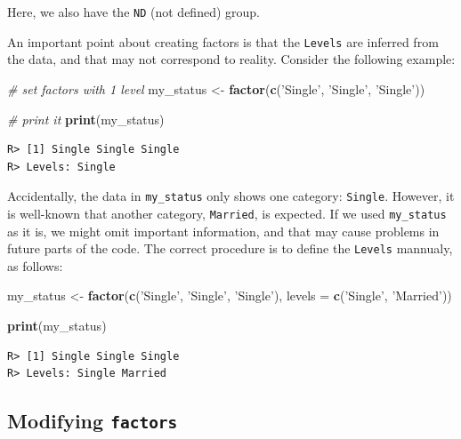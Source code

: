 \documentclass[
  12pt,
]{book}
\newenvironment{Shaded}{\begin{snugshade}}{\end{snugshade}}
\newcommand{\CommentTok}[1]{\textcolor[rgb]{0.37,0.37,0.37}{\textit{#1}}}
\newcommand{\DataTypeTok}[1]{\textcolor[rgb]{0.27,0.27,0.27}{#1}}
\newcommand{\KeywordTok}[1]{\textcolor[rgb]{0.27,0.27,0.27}{\textbf{#1}}}
\newcommand{\NormalTok}[1]{#1}
\newcommand{\StringTok}[1]{\textcolor[rgb]{0.5,0.5,0.5}{#1}}
\begin{document}
Here, we also have the \texttt{ND} (not defined) group.

An important point about creating factors is that the \texttt{Levels} are inferred from the data, and that may not correspond to reality. Consider the following example:

\begin{Shaded}
\begin{Highlighting}[]
\CommentTok{# set factors with 1 level}
\NormalTok{my_status <-}\StringTok{ }\KeywordTok{factor}\NormalTok{(}\KeywordTok{c}\NormalTok{(}\StringTok{'Single'}\NormalTok{, }\StringTok{'Single'}\NormalTok{, }\StringTok{'Single'}\NormalTok{))}

\CommentTok{# print it}
\KeywordTok{print}\NormalTok{(my_status)}
\end{Highlighting}
\end{Shaded}

\begin{verbatim}
R> [1] Single Single Single
R> Levels: Single
\end{verbatim}

Accidentally, the data in \texttt{my\_status} only shows one category: \texttt{Single}. However, it is well-known that another category, \texttt{Married}, is expected. If we used \texttt{my\_status} as it is, we might omit important information, and that may cause problems in future parts of the code. The correct procedure is to define the \texttt{Levels} mannualy, as follows:

\begin{Shaded}
\begin{Highlighting}[]
\NormalTok{my_status <-}\StringTok{ }\KeywordTok{factor}\NormalTok{(}\KeywordTok{c}\NormalTok{(}\StringTok{'Single'}\NormalTok{, }\StringTok{'Single'}\NormalTok{, }\StringTok{'Single'}\NormalTok{),}
                    \DataTypeTok{levels =} \KeywordTok{c}\NormalTok{(}\StringTok{'Single'}\NormalTok{, }\StringTok{'Married'}\NormalTok{))}

\KeywordTok{print}\NormalTok{(my_status)}
\end{Highlighting}
\end{Shaded}

\begin{verbatim}
R> [1] Single Single Single
R> Levels: Single Married
\end{verbatim}

\hypertarget{modifying-factors}{%
\subsection{\texorpdfstring{Modifying \texttt{factors}}{Modifying factors}}\label{modifying-factors}}
\end{document}
